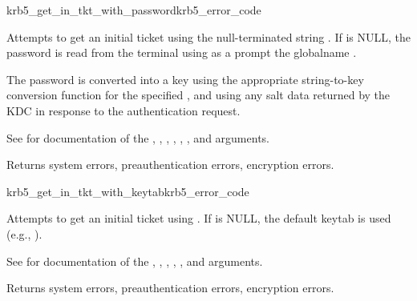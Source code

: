 \begin{funcdecl}{krb5_get_in_tkt_with_password}{krb5_error_code}{\funcinout}
\funcin
{}
\funcinout
{}
\end{funcdecl}

Attempts to get an initial ticket using the null-terminated string
.  If  is NULL, the password
is read from the terminal using as a prompt the globalname
.  

The password is converted into a key using the appropriate
string-to-key conversion function for the specified
, and using any salt data returned by the KDC in
response to the authentication request.

See  for documentation of the
, , ,
, , ,
 and  arguments.

Returns system errors, preauthentication errors, encryption errors.

\begin{funcdecl}{krb5_get_in_tkt_with_keytab}{krb5_error_code}{\funcinout}
\funcin
{}
\funcinout
{}
\end{funcdecl}

Attempts to get an initial ticket using .  If
 is NULL, the default keytab is used 
(e.g., ).

See  for documentation of the
, , ,
, ,  and
 arguments.

Returns system errors, preauthentication errors, encryption errors.

